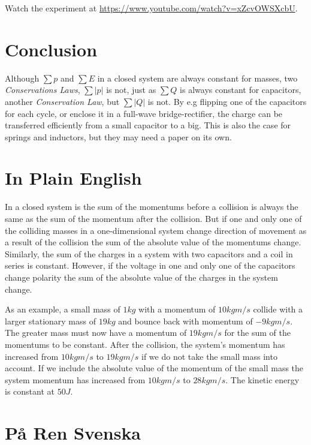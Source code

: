 \documentclass[]{../common/elementary-physics}
\begin{document}
Watch the experiment at \url{https://www.youtube.com/watch?v=xZcvOWSXcbU}.

\section{Conclusion}

Although $\sum p$ and $\sum E$ in a closed system are always constant for masses, two \textit{Conservations Laws}, $\sum | p |$ is not, just as $\sum Q$ is always constant for capacitors, another \textit{Conservation Law}, but $\sum | Q |$ is not.
By e.g flipping one of the capacitors for each cycle, or enclose it in a full-wave bridge-rectifier, the charge can be transferred efficiently from a small capacitor to a big.
This is also the case for springs and inductors, but they may need a paper on its own.

\appendix

\section{In Plain English}

In a closed system is the sum of the momentums before a collision is always the same as the sum of the momentum after the collision.
But if one and only one of the colliding masses in a one-dimensional system change direction of movement as a result of the collision the sum of the absolute value of the momentums change.
Similarly, the sum of the charges in a system with two capacitors and a coil in series is constant.
However, if the voltage in one and only one of the capacitors change polarity the sum of the absolute value of the charges in the system change.

As an example, a small mass of $1 kg$ with a momentum of $10 kgm/s$ collide with a larger stationary mass of $19 kg$ and bounce back with momentum of $-9 kgm/s$.
The greater mass must now have a momentum of $19 kgm/s$ for the sum of the momentums to be constant.
After the collision, the system's momentum has increased from $10 kgm/s$ to $19 kgm/s$ if we do not take the small mass into account.
If we include the absolute value of the momentum of the small mass the system momentum has increased from $10 kgm/s$ to $28 kgm/s$.
The kinetic energy is constant at $50 J$.

\section{På Ren Svenska}
\end{document}
